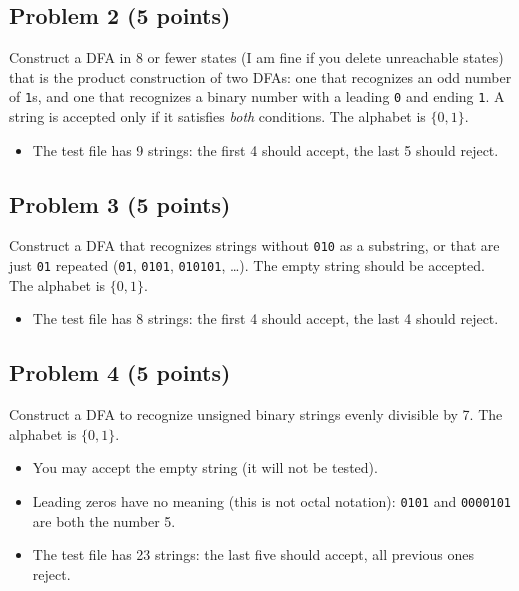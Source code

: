 \documentclass[11pt]{article}
\begin{document}
\subsection*{Problem 2 (5 points)}
Construct a DFA in 8 or fewer states (I am fine if you delete unreachable states) that is the
product construction of two DFAs: one that recognizes an odd number of \texttt{1}s, and one
that recognizes a binary number with a leading \texttt{0} and ending \texttt{1}. A string is
accepted only if it satisfies \emph{both} conditions. The alphabet is $\{0,1\}$.
\begin{itemize}
  \item The test file has 9 strings: the first 4 should accept, the last 5 should reject.
\end{itemize}

\subsection*{Problem 3 (5 points)}
Construct a DFA that recognizes strings without \texttt{010} as a substring, or that are just
\texttt{01} repeated (\texttt{01}, \texttt{0101}, \texttt{010101}, \ldots). The empty string
should be accepted. The alphabet is $\{0,1\}$.
\begin{itemize}
  \item The test file has 8 strings: the first 4 should accept, the last 4 should reject.
\end{itemize}

\subsection*{Problem 4 (5 points)}
Construct a DFA to recognize unsigned binary strings evenly divisible by 7. The alphabet is
$\{0,1\}$.
\begin{itemize}
  \item You may accept the empty string (it will not be tested).
  \item Leading zeros have no meaning (this is not octal notation): \texttt{0101} and
        \texttt{0000101} are both the number 5.
  \item The test file has 23 strings: the last five should accept, all previous ones reject.
\end{itemize}
\end{document}
